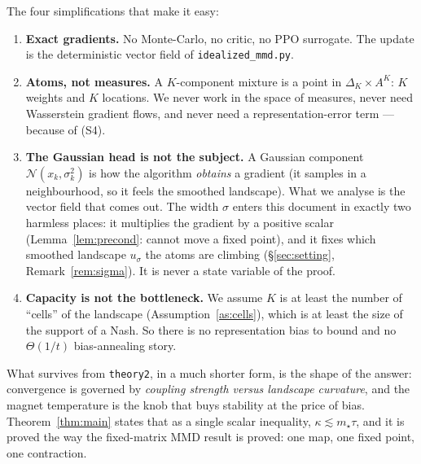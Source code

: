\documentclass[11pt,a4paper]{article}
\theoremstyle{plain}
\theoremstyle{definition}
\theoremstyle{remark}
\newcommand{\simplex}{\Delta}
\begin{document}
The four simplifications that make it easy:

\begin{enumerate}[label=(S\arabic*),leftmargin=*]
\item \textbf{Exact gradients.} No Monte-Carlo, no critic, no PPO surrogate. The
update is the deterministic vector field of \texttt{idealized\_mmd.py}.
\item \textbf{Atoms, not measures.} A $K$-component mixture is a point in
$\simplex_K \times A^K$: $K$ weights and $K$ locations. We never work in the space
of measures, never need Wasserstein gradient flows, and never need a
representation-error term --- because of (S4).
\item \textbf{The Gaussian head is not the subject.} A Gaussian component
$\mathcal N(x_k,\sigma_k^2)$ is how the algorithm \emph{obtains} a gradient
(it samples in a neighbourhood, so it feels the smoothed landscape). What we
analyse is the vector field that comes out. The width $\sigma$ enters this
document in exactly two harmless places: it multiplies the gradient by a positive
scalar (Lemma~\ref{lem:precond}: cannot move a fixed point), and it fixes which
smoothed landscape $u_\sigma$ the atoms are climbing (\S\ref{sec:setting},
Remark~\ref{rem:sigma}). It is never a state variable of the proof.
\item \textbf{Capacity is not the bottleneck.} We assume $K$ is at least the
number of ``cells'' of the landscape (Assumption~\ref{as:cells}), which is at
least the size of the support of a Nash. So there is no representation bias to
bound and no $\Theta(1/t)$ bias-annealing story.
\end{enumerate}

What survives from \texttt{theory2}, in a much shorter form, is the shape of the
answer: convergence is governed by \emph{coupling strength versus landscape
curvature}, and the magnet temperature is the knob that buys stability at the
price of bias. Theorem~\ref{thm:main} states that as a single scalar inequality,
$\kappa\lesssim m_\star\tau$, and it is proved the way the fixed-matrix MMD result is
proved: one map, one fixed point, one contraction.
\end{document}
